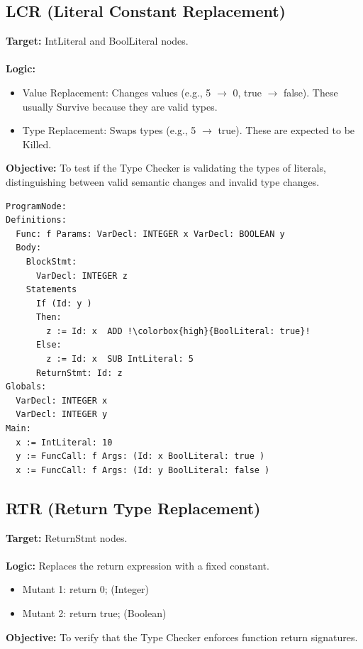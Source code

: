 \documentclass[titlepage]{article}
\begin{document}
\newpage

\subsection{LCR (Literal Constant Replacement)}

\textbf{Target:} IntLiteral and BoolLiteral nodes. \\ \\
\textbf{Logic:}
\begin{itemize}[nosep]
    \item Value Replacement: Changes values (e.g., 5 $\to$ 0, true $\to$ false). These usually Survive because they are valid types.
    \item Type Replacement: Swaps types (e.g., 5 $\to$ true). These are expected to be Killed. \\
\end{itemize}
\textbf{Objective:} To test if the Type Checker is validating the types of literals, distinguishing between valid semantic changes and invalid type changes.

\begin{lstlisting}[escapechar=!, caption={LCR Mutated AST (Killed)}, label={lst:lcr_mut_ast}]
ProgramNode:
Definitions: 
  Func: f Params: VarDecl: INTEGER x VarDecl: BOOLEAN y 
  Body:
    BlockStmt:
      VarDecl: INTEGER z 
    Statements
      If (Id: y )
      Then:
        z := Id: x  ADD !\colorbox{high}{BoolLiteral: true}! 
      Else:
        z := Id: x  SUB IntLiteral: 5 
      ReturnStmt: Id: z 
Globals: 
  VarDecl: INTEGER x 
  VarDecl: INTEGER y 
Main: 
  x := IntLiteral: 10 
  y := FuncCall: f Args: (Id: x BoolLiteral: true )
  x := FuncCall: f Args: (Id: y BoolLiteral: false )
\end{lstlisting}

\newpage

\subsection{RTR (Return Type Replacement)}

\textbf{Target:} ReturnStmt nodes. \\ \\
\textbf{Logic:} Replaces the return expression with a fixed constant.
\begin{itemize}[nosep]
    \item Mutant 1: return 0; (Integer)
    \item Mutant 2: return true; (Boolean) \\
\end{itemize}
\textbf{Objective:} To verify that the Type Checker enforces function return signatures.
\end{document}

